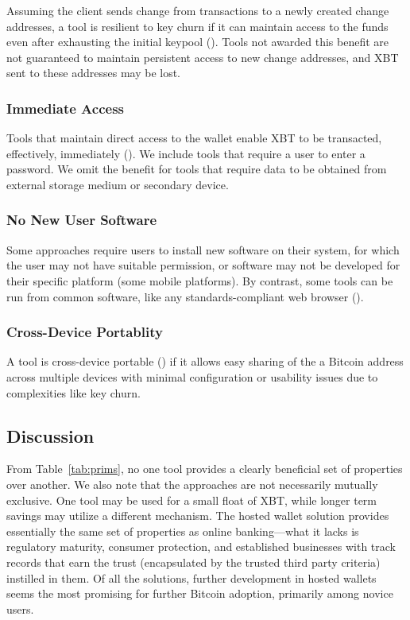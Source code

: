 Assuming the client sends change from transactions to a newly created change addresses, a tool is resilient to key churn if it can maintain access to the funds even after exhausting the initial keypool (\full). Tools not awarded this benefit are not guaranteed to maintain persistent access to new change addresses, and XBT sent to these addresses may be lost.

\subsubsection{Immediate Access}
\label{Immediate Access}

Tools that maintain direct access to the wallet enable XBT to be transacted, effectively, immediately (\full). We include tools that require a user to enter a password. We omit the benefit for tools that require data to be obtained from external storage medium or secondary device. 

\subsubsection{No New User Software} 
\label{No New Software}

Some approaches require users to install new software on their system, for which the user may not have suitable permission, or software may not be developed for their specific platform (\eg some mobile platforms). By contrast, some tools can be run from common software, like any standards-compliant web browser (\full). 

\subsubsection{Cross-Device Portablity}
\label{Portable}

A tool is cross-device portable (\full) if it allows easy sharing of the a Bitcoin address across multiple devices with minimal configuration or usability issues due to complexities like key churn.

\subsection{Discussion}

From Table~\ref{tab:prims}, no one tool provides a clearly beneficial set of properties over another. We also note that the approaches are not necessarily mutually exclusive. One tool may be used for a small float of XBT, while longer term savings may utilize a different mechanism. The hosted wallet solution provides essentially the same set of properties as online banking---what it lacks is regulatory maturity, consumer protection, and established businesses with track records that earn the trust (encapsulated by the trusted third party criteria) instilled in them. Of all the solutions, further development in hosted wallets seems the most promising for further Bitcoin adoption, primarily among novice users. 

